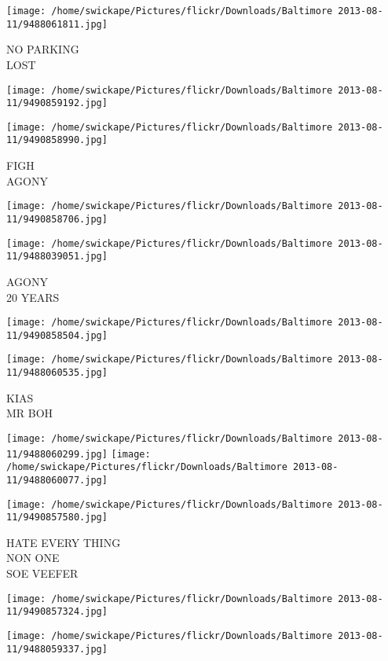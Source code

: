 \documentclass[10pt,letterpaper]{article}
\begin{document}
\vspace{0.25in}
\texttt{[image: /home/swickape/Pictures/flickr/Downloads/Baltimore 2013-08-11/9488061811.jpg]}

NO PARKING\\
LOST
\pagebreak

\texttt{[image: /home/swickape/Pictures/flickr/Downloads/Baltimore 2013-08-11/9490859192.jpg]}

\vspace{0.25in}
\texttt{[image: /home/swickape/Pictures/flickr/Downloads/Baltimore 2013-08-11/9490858990.jpg]}

FIGH\\
AGONY
\pagebreak

\texttt{[image: /home/swickape/Pictures/flickr/Downloads/Baltimore 2013-08-11/9490858706.jpg]}

\vspace{0.25in}
\texttt{[image: /home/swickape/Pictures/flickr/Downloads/Baltimore 2013-08-11/9488039051.jpg]}

AGONY\\
20 YEARS
\pagebreak

\texttt{[image: /home/swickape/Pictures/flickr/Downloads/Baltimore 2013-08-11/9490858504.jpg]}

\vspace{0.25in}
\texttt{[image: /home/swickape/Pictures/flickr/Downloads/Baltimore 2013-08-11/9488060535.jpg]}

KIAS\\
MR BOH
\pagebreak

\texttt{[image: /home/swickape/Pictures/flickr/Downloads/Baltimore 2013-08-11/9488060299.jpg]}
\texttt{[image: /home/swickape/Pictures/flickr/Downloads/Baltimore 2013-08-11/9488060077.jpg]}

\vspace{0.25in}
\texttt{[image: /home/swickape/Pictures/flickr/Downloads/Baltimore 2013-08-11/9490857580.jpg]}

HATE EVERY THING\\
NON ONE\\
SOE VEEFER
\pagebreak

\texttt{[image: /home/swickape/Pictures/flickr/Downloads/Baltimore 2013-08-11/9490857324.jpg]}

\vspace{0.25in}
\texttt{[image: /home/swickape/Pictures/flickr/Downloads/Baltimore 2013-08-11/9488059337.jpg]}
\end{document}
